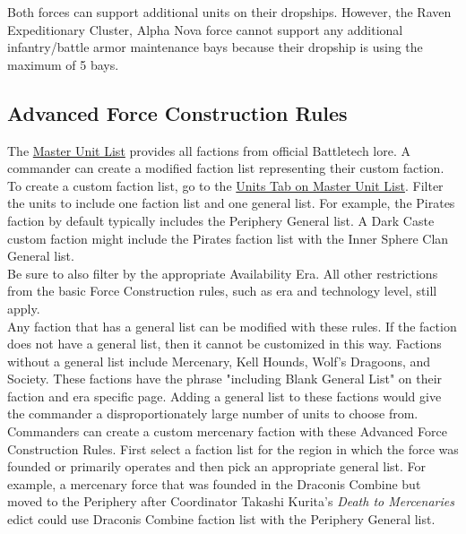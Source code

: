 \documentclass[UTF8]{article}
\begin{document}
Both forces can support additional units on their dropships.
However, the Raven Expeditionary Cluster, Alpha Nova force cannot support any additional infantry/battle armor maintenance bays because their dropship is using the maximum of 5 bays.\\

\newpage

\subsection{Advanced Force Construction Rules}

The \href{http://www.masterunitlist.info/}{Master Unit List} provides all factions from official Battletech lore.
A commander can create a modified faction list representing their custom faction.\\

To create a custom faction list, go to the \href{http://www.masterunitlist.info/Unit/Filter}{Units Tab on Master Unit List}.
Filter the units to include one faction list and one general list.
For example, the Pirates faction by default typically includes the Periphery General list.
A Dark Caste custom faction might include the Pirates faction list with the Inner Sphere Clan General list.\\

Be sure to also filter by the appropriate Availability Era.
All other restrictions from the basic Force Construction rules, such as era and technology level, still apply.\\ 

Any faction that has a general list can be modified with these rules.
If the faction does not have a general list, then it cannot be customized in this way.
Factions without a general list include Mercenary, Kell Hounds, Wolf's Dragoons, and Society.
These factions have the phrase "including Blank General List" on their faction and era specific page.
Adding a general list to these factions would give the commander a disproportionately large number of units to choose from.\\

Commanders can create a custom mercenary faction with these Advanced Force Construction Rules.
First select a faction list for the region in which the force was founded or primarily operates and then pick an appropriate general list.
For example, a mercenary force that was founded in the Draconis Combine but moved to the Periphery after Coordinator Takashi Kurita's \emph{Death to Mercenaries} edict could use Draconis Combine faction list with the Periphery General list.\\
\end{document}
